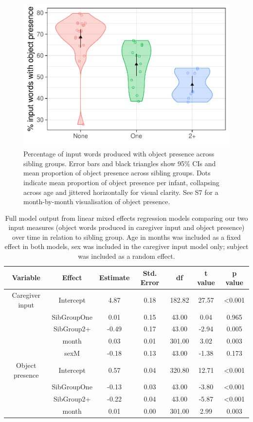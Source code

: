 \documentclass[
  man,mask,floatsintext]{apa6}
\begin{document}
\begin{figure}
\centering
\includegraphics{SiblingsStudyText-anon-revisions_files/figure-latex/Figure-object-presence-1.pdf}
\caption{\label{fig:Figure-object-presence}Percentage of input words produced with object presence across sibling groups. Error bars and black triangles show 95\% CIs and mean proportion of object presence across sibling groups. Dots indicate mean proportion of object presence per infant, collapsing across age and jittered horizontally for visual clarity. See S7 for a month-by-month visualisation of object presence.}
\end{figure}

\begin{longtable}[t]{ccccccc}
\caption{\label{tab:table-input-model-summary}Full model output from linear mixed effects regression models comparing our two input measures (object words produced in caregiver input and object presence) over time in relation to sibling group. Age in months was included as a fixed effect in both models, sex was included in the caregiver input model only; subject was included as a random effect.}\\
\toprule
Variable & Effect & Estimate & Std. Error & df & t value & p value\\
\midrule
Caregiver input & Intercept & 4.87 & 0.18 & 182.82 & 27.57 & <0.001\\
 & SibGroupOne & 0.01 & 0.15 & 43.00 & 0.04 & 0.965\\
 & SibGroup2+ & -0.49 & 0.17 & 43.00 & -2.94 & 0.005\\
 & month & 0.03 & 0.01 & 301.00 & 3.02 & 0.003\\
 & sexM & -0.18 & 0.13 & 43.00 & -1.38 & 0.173\\
\midrule
\addlinespace
Object presence & Intercept & 0.57 & 0.04 & 320.80 & 12.71 & <0.001\\
 & SibGroupOne & -0.13 & 0.03 & 43.00 & -3.80 & <0.001\\
 & SibGroup2+ & -0.22 & 0.04 & 43.00 & -5.87 & <0.001\\
 & month & 0.01 & 0.00 & 301.00 & 2.99 & 0.003\\
\bottomrule
\end{longtable}
\end{document}

